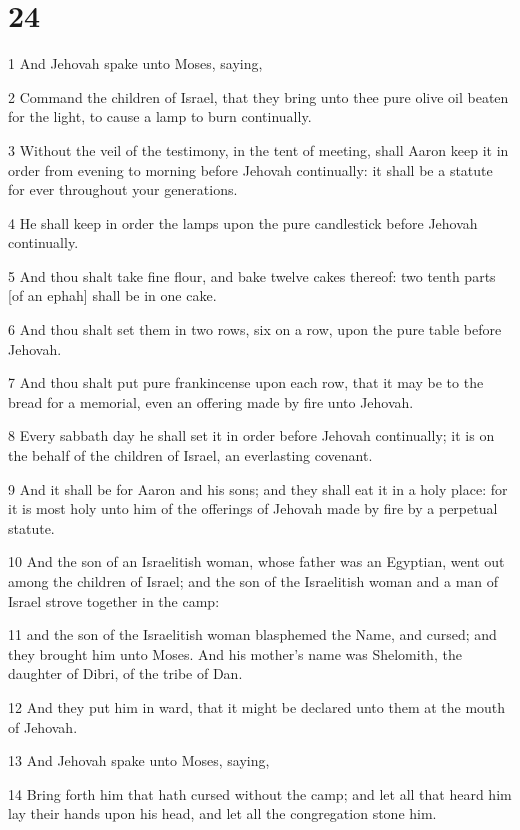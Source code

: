 \chapter{24}

\par 1 And Jehovah spake unto Moses, saying,
\par 2 Command the children of Israel, that they bring unto thee pure olive oil beaten for the light, to cause a lamp to burn continually.
\par 3 Without the veil of the testimony, in the tent of meeting, shall Aaron keep it in order from evening to morning before Jehovah continually: it shall be a statute for ever throughout your generations.
\par 4 He shall keep in order the lamps upon the pure candlestick before Jehovah continually.
\par 5 And thou shalt take fine flour, and bake twelve cakes thereof: two tenth parts [of an ephah] shall be in one cake.
\par 6 And thou shalt set them in two rows, six on a row, upon the pure table before Jehovah.
\par 7 And thou shalt put pure frankincense upon each row, that it may be to the bread for a memorial, even an offering made by fire unto Jehovah.
\par 8 Every sabbath day he shall set it in order before Jehovah continually; it is on the behalf of the children of Israel, an everlasting covenant.
\par 9 And it shall be for Aaron and his sons; and they shall eat it in a holy place: for it is most holy unto him of the offerings of Jehovah made by fire by a perpetual statute.
\par 10 And the son of an Israelitish woman, whose father was an Egyptian, went out among the children of Israel; and the son of the Israelitish woman and a man of Israel strove together in the camp:
\par 11 and the son of the Israelitish woman blasphemed the Name, and cursed; and they brought him unto Moses. And his mother's name was Shelomith, the daughter of Dibri, of the tribe of Dan.
\par 12 And they put him in ward, that it might be declared unto them at the mouth of Jehovah.
\par 13 And Jehovah spake unto Moses, saying,
\par 14 Bring forth him that hath cursed without the camp; and let all that heard him lay their hands upon his head, and let all the congregation stone him.
